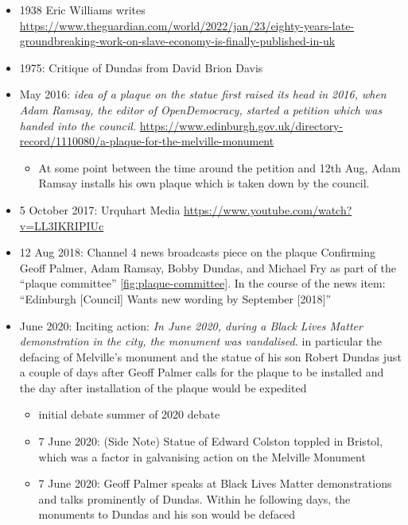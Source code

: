 \documentclass{scrartcl}
\begin{document}
\begin{itemize}
    \item 1938 Eric Williams writes \url{https://www.theguardian.com/world/2022/jan/23/eighty-years-late-groundbreaking-work-on-slave-economy-is-finally-published-in-uk}
    \item 1975: Critique of Dundas from David Brion Davis \cite{davis_1975}
    \item May 2016: \textit{idea of a plaque on the statue first raised its head in 2016, when Adam Ramsay, the editor of OpenDemocracy, started a petition which was handed into the council.}\cite{anderson_2021} \url{https://www.edinburgh.gov.uk/directory-record/1110080/a-plaque-for-the-melville-monument}
    \begin{itemize}
        \item At some point between the time around the petition and 12th Aug, Adam Ramsay installs his own plaque which is taken down by the council.
    \end{itemize}
    \item 5 October 2017: Urquhart Media \url{https://www.youtube.com/watch?v=LL3IKRIPIUc}
    \item 12 Aug 2018: Channel 4 news broadcasts piece on the plaque \cite{c4n_2018} Confirming Geoff Palmer, Adam Ramsay, Bobby Dundas, and Michael Fry as part of the ``plaque committee'' \ref{fig:plaque-committee}. In the course of the news item: ``Edinburgh [Council] Wants new wording by September [2018]''
    \item  June 2020: Inciting action: \textit{In June 2020, during a Black Lives Matter demonstration in the city, the monument was vandalised.}\cite{anderson_2021}  in particular the defacing of Melville's monument and the statue of his son Robert Dundas \cite{hay_2020_3} just a couple of days after Geoff Palmer calls for the plaque to be installed \cite{hay_2020_1} and the day after installation of the plaque would be expedited \cite{hoffman_2020, daily_2020} 
    \begin{itemize}
        \item initial debate summer of 2020 debate\cite{mccarthy_2022}
        \item 7 June 2020: (Side Note) Statue of Edward Colston toppled in Bristol, which was a factor in galvanising action on the Melville Monument 
        \item 7 June 2020: Geoff Palmer speaks at Black Lives Matter demonstrations and talks prominently of Dundas. Within he following days, the monuments to Dundas and his son would be defaced \cite{hay_2020_3} 


\end{itemize}
\end{itemize}
\end{document}
